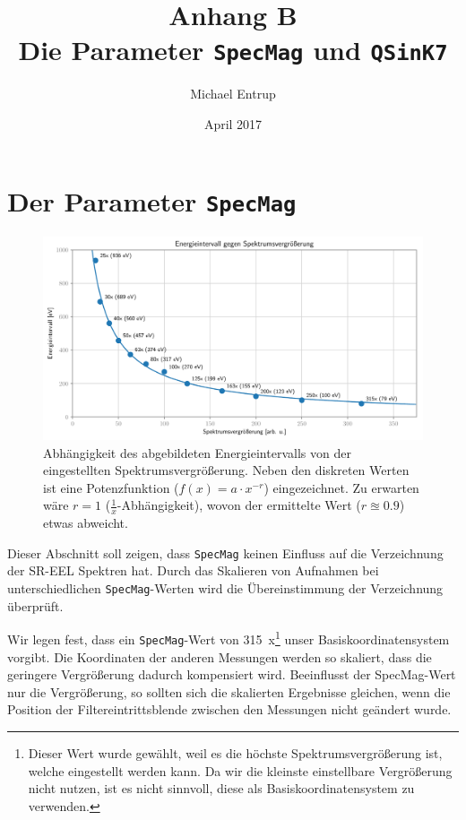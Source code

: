 \documentclass[
	paper=a4,				%
	twoside=true,			%
	BCOR=6mm,				%
	fontsize=12pt,			%
	pagesize=auto,			%
	numbers=noenddot,		%
	bibliography=totoc,		%
	draft=false
]{scrartcl}
\begin{document}
	

\author{Michael Entrup}
\title{Anhang B \\ Die Parameter \texttt{SpecMag} und \texttt{QSinK7}}
\date{April 2017}

\maketitle

\tableofcontents

\section{Der Parameter \texttt{SpecMag}} \label{append:Characterisierung-SpecMag}

\begin{figure}
	\centering
	\includegraphics[width=1\linewidth]{../../Jupyter-Notebooks/Kapitel1/Bilder/Intervall_vs_SpecMag}
	\caption{Abhängigkeit des abgebildeten Energieintervalls von der eingestellten Spektrumsvergrößerung. Neben den diskreten Werten ist eine Potenzfunktion ($f(x) = a\cdot x^{-r}$) eingezeichnet. Zu erwarten wäre $r=1$ ($\frac{1}{x}$-Abhängigkeit), wovon der ermittelte Wert ($r\approxeq\num{0,9}$) etwas abweicht.}
	\label{fig:SpecMag}
\end{figure}

Dieser Abschnitt soll zeigen, dass \texttt{SpecMag} keinen Einfluss auf die Verzeichnung der SR-EEL Spektren hat. Durch das Skalieren von Aufnahmen bei unterschiedlichen \texttt{SpecMag}-Werten wird die Übereinstimmung der Verzeichnung überprüft.

Wir legen fest, dass ein \texttt{SpecMag}-Wert von \SI{315}{x}\footnote{Dieser Wert wurde gewählt, weil es die höchste Spektrumsvergrößerung ist, welche eingestellt werden kann. Da wir die kleinste einstellbare Vergrößerung nicht nutzen, ist es nicht sinnvoll, diese als Basiskoordinatensystem zu verwenden.} unser Basiskoordinatensystem vorgibt. Die Koordinaten der anderen Messungen werden so skaliert, dass die geringere Vergrößerung dadurch kompensiert wird. Beeinflusst der SpecMag-Wert nur die Vergrößerung, so sollten sich die skalierten Ergebnisse gleichen, wenn die Position der Filtereintrittsblende zwischen den Messungen nicht geändert wurde.
\end{document}
